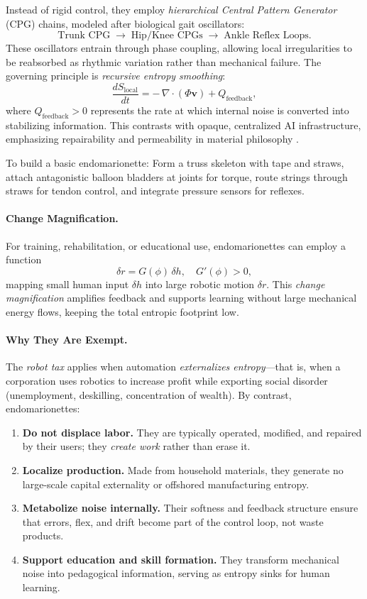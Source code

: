 \documentclass[12pt]{article}
\begin{document}
Instead of rigid control, they employ \emph{hierarchical Central Pattern Generator} (CPG) chains, modeled after biological gait oscillators:
\[
\text{Trunk CPG} \;\to\; \text{Hip/Knee CPGs} \;\to\; \text{Ankle Reflex Loops}.
\]
These oscillators entrain through phase coupling, allowing local irregularities to be reabsorbed as rhythmic variation rather than mechanical failure. The governing principle is \emph{recursive entropy smoothing}:
\[
\frac{dS_{\text{local}}}{dt} = -\,\nabla\!\cdot(\Phi \mathbf{v}) + Q_{\text{feedback}},
\]
where $Q_{\text{feedback}}>0$ represents the rate at which internal noise is converted into stabilizing information. This contrasts with opaque, centralized AI infrastructure, emphasizing repairability and permeability in material philosophy \citep{strogatz2018sync, kelly1994outofcontrol}.

To build a basic endomarionette: Form a truss skeleton with tape and straws, attach antagonistic balloon bladders at joints for torque, route strings through straws for tendon control, and integrate pressure sensors for reflexes.

\paragraph{Change Magnification.}
For training, rehabilitation, or educational use, endomarionettes can employ a function
\[
\delta r = G(\phi)\,\delta h, \quad G'(\phi) > 0,
\]
mapping small human input $\delta h$ into large robotic motion $\delta r$. This \emph{change magnification} amplifies feedback and supports learning without large mechanical energy flows, keeping the total entropic footprint low.

\paragraph{Why They Are Exempt.}
The \emph{robot tax} applies when automation \emph{externalizes entropy}—that is, when a corporation uses robotics to increase profit while exporting social disorder (unemployment, deskilling, concentration of wealth). By contrast, endomarionettes:
\begin{enumerate}[label=(\alph*)]
    \item \textbf{Do not displace labor.} They are typically operated, modified, and repaired by their users; they \emph{create work} rather than erase it.
    \item \textbf{Localize production.} Made from household materials, they generate no large-scale capital externality or offshored manufacturing entropy.
    \item \textbf{Metabolize noise internally.} Their softness and feedback structure ensure that errors, flex, and drift become part of the control loop, not waste products.
    \item \textbf{Support education and skill formation.} They transform mechanical noise into pedagogical information, serving as entropy sinks for human learning.
\end{enumerate}
\end{document}
